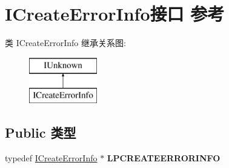 \hypertarget{interface_i_create_error_info}{}\section{I\+Create\+Error\+Info接口 参考}
\label{interface_i_create_error_info}
类 I\+Create\+Error\+Info 继承关系图\+:\begin{figure}[H]
\begin{center}
\leavevmode
\includegraphics[height=2.000000cm]{interface_i_create_error_info}
\end{center}
\end{figure}
\subsection*{Public 类型}
\begin{DoxyCompactItemize}
\item 
\mbox{\label{interface_i_create_error_info_aa015d4576231c1f8f726fc7d6781da94}} 
typedef \hyperlink{interface_i_create_error_info}{I\+Create\+Error\+Info} $\ast$ {\bfseries L\+P\+C\+R\+E\+A\+T\+E\+E\+R\+R\+O\+R\+I\+N\+FO}
\end{DoxyCompactItemize}
